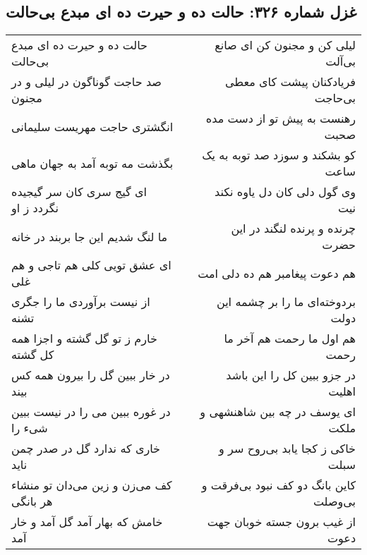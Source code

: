 \begin{center}
\section*{غزل شماره ۳۲۶: حالت ده و حیرت ده ای مبدع بی‌حالت}
\label{sec:0326}
\begin{longtable}{l p{0.5cm} r}
حالت ده و حیرت ده ای مبدع بی‌حالت
&&
لیلی کن و مجنون کن ای صانع بی‌آلت
\\
صد حاجت گوناگون در لیلی و در مجنون
&&
فریادکنان پیشت کای معطی بی‌حاجت
\\
انگشتری حاجت مهریست سلیمانی
&&
رهنست به پیش تو از دست مده صحبت
\\
بگذشت مه توبه آمد به جهان ماهی
&&
کو بشکند و سوزد صد توبه به یک ساعت
\\
ای گیج سری کان سر گیجیده نگردد ز او
&&
وی گول دلی کان دل یاوه نکند نیت
\\
ما لنگ شدیم این جا بربند در خانه
&&
چرنده و پرنده لنگند در این حضرت
\\
ای عشق تویی کلی هم تاجی و هم غلی
&&
هم دعوت پیغامبر هم ده دلی امت
\\
از نیست برآوردی ما را جگری تشنه
&&
بردوخته‌ای ما را بر چشمه این دولت
\\
خارم ز تو گل گشته و اجزا همه کل گشته
&&
هم اول ما رحمت هم آخر ما رحمت
\\
در خار ببین گل را بیرون همه کس بیند
&&
در جزو ببین کل را این باشد اهلیت
\\
در غوره ببین می را در نیست ببین شیء را
&&
ای یوسف در چه بین شاهنشهی و ملکت
\\
خاری که ندارد گل در صدر چمن ناید
&&
خاکی ز کجا یابد بی‌روح سر و سبلت
\\
کف می‌زن و زین می‌دان تو منشاء هر بانگی
&&
کاین بانگ دو کف نبود بی‌فرقت و بی‌وصلت
\\
خامش که بهار آمد گل آمد و خار آمد
&&
از غیب برون جسته خوبان جهت دعوت
\\
\end{longtable}
\end{center}
